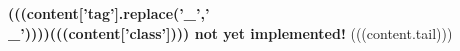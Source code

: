 
{\color{red} \textbf{(((content['tag'].replace('_','\\_'))))(((content['class']))) not yet implemented!}}
(((content.tail)))
